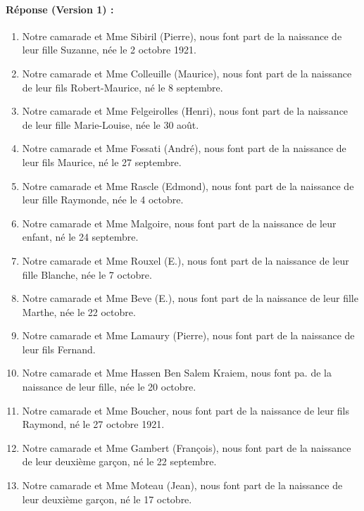 \paragraph{Réponse (Version 1) :}
\begin{enumerate}
    \item Notre camarade et Mme Sibiril (Pierre), nous font part de la naissance de leur fille Suzanne, née le 2 octobre 1921.
    \item Notre camarade et Mme Colleuille (Maurice), nous font part de la naissance de leur fils Robert-Maurice, né le 8 septembre.
    \item Notre camarade et Mme Felgeirolles (Henri), nous font part de la naissance de leur fille Marie-Louise, née le 30 août.
    \item Notre camarade et Mme Fossati (André), nous font part de la naissance de leur fils Maurice, né le 27 septembre.
    \item Notre camarade et Mme Rascle (Edmond), nous font part de la naissance de leur fille Raymonde, née le 4 octobre.
    \item Notre camarade et Mme Malgoire, nous font part de la naissance de leur enfant, né le 24 septembre.
    \item Notre camarade et Mme Rouxel (E.), nous font part de la naissance de leur fille Blanche, née le 7 octobre.
    \item Notre camarade et Mme Beve (E.), nous font part de la naissance de leur fille Marthe, née le 22 octobre.
    \item Notre camarade et Mme Lamaury (Pierre), nous font part de la naissance de leur fils Fernand.
    \item Notre camarade et Mme Hassen Ben Salem Kraiem, nous font pa. de la naissance de leur fille, née le 20 octobre.
    \item Notre camarade et Mme Boucher, nous font part de la naissance de leur fils Raymond, né le 27 octobre 1921.
    \item Notre camarade et Mme Gambert (François), nous font part de la naissance de leur deuxième garçon, né le 22 septembre.
    \item Notre camarade et Mme Moteau (Jean), nous font part de la naissance de leur deuxième garçon, né le 17 octobre.
\end{enumerate}


